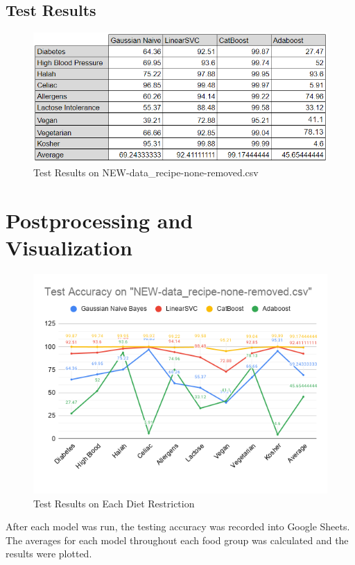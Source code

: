 \documentclass[twocolumn]{article}
\begin{document}
\subsection{Test Results}
\begin{figure}[h]
	\centering
	\includegraphics[width=1\linewidth]{"NEW-data_recipe-none-removed results"}
	\caption{Test Results on NEW-data_recipe-none-removed.csv}
	\label{fig:new-datarecipe-none-removed-results}
\end{figure}


\section{Postprocessing and \\Visualization}
\begin{figure}[h]
	\centering
	\includegraphics[width=1\linewidth]{"Test Accuracy on _NEW-data_recipe-none-removed.csv_"}
	\caption{Test Results on Each Diet Restriction}
	\label{fig:test-accuracy-on-new-datarecipe-none-removed}
\end{figure}
After each model was run, the testing accuracy was recorded into Google Sheets. The averages for each model throughout each food group was calculated and the results were plotted.
\end{document}
